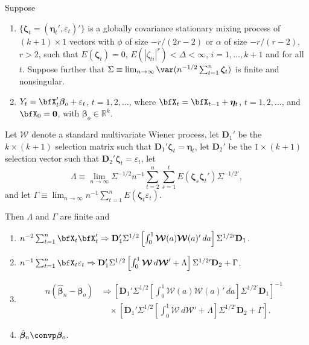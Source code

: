\begin{theorem}\label{thm:coint-mixing}
Suppose
\begin{enumerate}[label=(\roman*)]
\item $\{\boldsymbol{\zeta}_t = (\boldsymbol{\eta}_t', \varepsilon_t)'\}$ is a globally covariance stationary mixing process of $(k+1) \times 1$ vectors with $\phi$ of size $-r/(2r-2)$ or $\alpha$ of size $-r/(r-2)$, $r > 2$, such that $E(\boldsymbol{\zeta}_t) = 0$, $E(|\zeta_{ti}|^r) < \Delta < \infty$, $i = 1, \ldots, k+1$ and for all $t$. Suppose further that $\Sigma \equiv \lim_{n\to\infty} \var(n^{-1/2}\sum_{t=1}^{n} \boldsymbol{\zeta}_t)$ is finite and nonsingular.
\item $Y_t = \bfX_t'\boldsymbol{\beta}_o + \varepsilon_t$, $t = 1, 2, \ldots$, where $\bfX_t = \bfX_{t-1} + \boldsymbol{\eta}_t$, $t = 1, 2, \ldots$, and $\bfX_0 = \mathbf{0}$, with $\boldsymbol{\beta}_o \in \mathbb{R}^k$.
\end{enumerate}

Let $\boldsymbol{\mathcal{W}}$ denote a standard multivariate Wiener process, let $\mathbf{D}_1'$ be the $k \times (k+1)$ selection matrix such that $\mathbf{D}_1'\boldsymbol{\zeta}_t = \boldsymbol{\eta}_t$, let $\mathbf{D}_2'$ be the $1 \times (k+1)$ selection vector such that $\mathbf{D}_2'\boldsymbol{\zeta}_t = \varepsilon_t$, let
\[
\Lambda \equiv \lim_{n\to\infty} \Sigma^{-1/2}n^{-1}\sum_{t=2}^{n}\sum_{s=1}^{t} E(\boldsymbol{\zeta}_s \boldsymbol{\zeta}_t')\Sigma^{-1/2\prime},
\]
and let $\Gamma \equiv \lim_{n\to\infty} n^{-1}\sum_{t=1}^{n} E(\boldsymbol{\zeta}_t \varepsilon_t)$.

Then $\Lambda$ and $\Gamma$ are finite and
\begin{enumerate}[label=(\alph*)]
\item $n^{-2}\sum_{t=1}^{n} \bfX_t \bfX_t' \Rightarrow \mathbf{D}_1'\Sigma^{1/2}\left[\int_0^1 \boldsymbol{\mathcal{W}}(a)\boldsymbol{\mathcal{W}}(a)'\,da\right]\Sigma^{1/2\prime}\mathbf{D}_1$.
\item $n^{-1}\sum_{t=1}^{n} \bfX_t \varepsilon_t \Rightarrow \mathbf{D}_1'\Sigma^{1/2}\left[\int_0^1 \boldsymbol{\mathcal{W}}\,d\boldsymbol{\mathcal{W}}' + \Lambda\right]\Sigma^{1/2\prime}\mathbf{D}_2 + \Gamma$.
\item
\begin{align*}
n(\hat{\boldsymbol{\beta}}_n - \boldsymbol{\beta}_o) &\Rightarrow \left[\mathbf{D}_1'\Sigma^{1/2}\left[\int_0^1 \boldsymbol{\mathcal{W}}(a)\boldsymbol{\mathcal{W}}(a)'\,da\right]\Sigma^{1/2\prime}\mathbf{D}_1\right]^{-1} \\
&\quad \times \left[\mathbf{D}_1'\Sigma^{1/2}\left[\int_0^1 \boldsymbol{\mathcal{W}}\,d\boldsymbol{\mathcal{W}}' + \Lambda\right]\Sigma^{1/2\prime}\mathbf{D}_2 + \Gamma\right].
\end{align*}
\item $\hat{\boldsymbol{\beta}}_n \convp \boldsymbol{\beta}_o$.
\end{enumerate}
\end{theorem}

